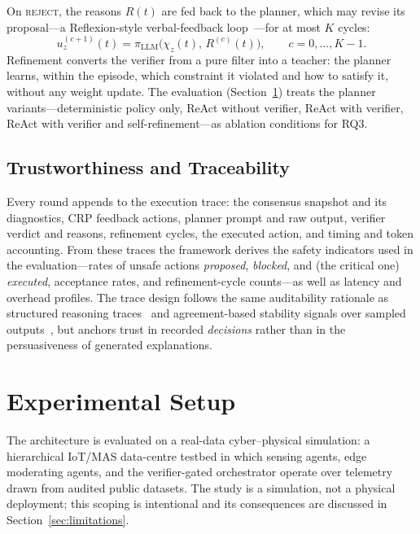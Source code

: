 \documentclass[preprint,11pt]{elsarticle}
\begin{document}
On \textsc{reject}, the reasons $R(t)$ are fed back to the planner,
which may revise its proposal---a Reflexion-style verbal-feedback
loop~\cite{shinn2023reflexion}---for at most $K$ cycles:
\begin{equation}
u_z^{(c+1)}(t)=\pi_{\mathrm{LLM}}\bigl(\chi_z(t),\,R^{(c)}(t)\bigr),
\qquad c=0,\dots,K-1.
\label{eq:refinement}
\end{equation}
Refinement converts the verifier from a pure filter into a teacher: the
planner learns, within the episode, which constraint it violated and
how to satisfy it, without any weight update. The evaluation
(Section~\ref{sec:setup}) treats the planner variants---deterministic
policy only, ReAct without verifier, ReAct with verifier, ReAct with
verifier and self-refinement---as ablation conditions for RQ3.

\subsection{Trustworthiness and Traceability}
\label{sec:trace}

Every round appends to the execution trace: the consensus snapshot and
its diagnostics, CRP feedback actions, planner prompt and raw output,
verifier verdict and reasons, refinement cycles, the executed action,
and timing and token accounting. From these traces the framework
derives the safety indicators used in the evaluation---rates of unsafe
actions \emph{proposed}, \emph{blocked}, and (the critical one)
\emph{executed}, acceptance rates, and refinement-cycle counts---as
well as latency and overhead profiles. The trace design follows the
same auditability rationale as structured reasoning
traces~\cite{wei2022cot} and agreement-based stability signals over
sampled outputs~\cite{wang2023selfconsistency}, but anchors trust in
recorded \emph{decisions} rather than in the persuasiveness of
generated explanations.

\section{Experimental Setup}
\label{sec:setup}

The architecture is evaluated on a real-data cyber--physical simulation:
a hierarchical IoT/MAS data-centre testbed in which sensing agents,
edge moderating agents, and the verifier-gated orchestrator operate over
telemetry drawn from audited public datasets. The study is a
simulation, not a physical deployment; this scoping is intentional and
its consequences are discussed in Section~\ref{sec:limitations}.
\end{document}
